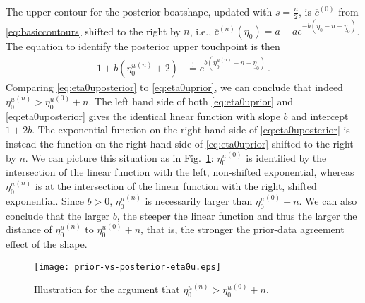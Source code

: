\documentclass[runningheads,a4paper]{llncs}
\newcommand{\uz}{^{(0)}} %
\newcommand{\un}{^{(n)}} %
\newcommand{\ul}[1]{\underline{#1}}
\newcommand{\ol}[1]{\overline{#1}}
\def\ezl{\ul{\eta}_0}
\def\czu{\ol{c}\uz}
\def\cnu{\ol{c}\un}
\begin{document}
The upper contour for the posterior boatshape,
updated with $s = \frac{n}{2}$, %
is $\czu$ from \eqref{eq:basiccontours} shifted to the right by $n$, i.e.,
$\cnu(\eta_0) = a - a e^{-b(\eta_0 - n -\ezl)}$.
The equation to identify the posterior upper touchpoint is then
\begin{align}
1 + b({\eta_0^u}\un + 2) &\stackrel{!}{=} e^{b({\eta_0^u}\un - n - \ezl)} \,.
\label{eq:eta0uposterior}
\end{align}
Comparing \eqref{eq:eta0uposterior} to \eqref{eq:eta0uprior}, we can conclude
that indeed ${\eta_0^u}\un > {\eta_0^u}\uz + n$.
%
The left hand side of both \eqref{eq:eta0uprior} and \eqref{eq:eta0uposterior}
gives the identical linear function with slope $b$ and intercept $1+2b$. %
The exponential function on the right hand side of \eqref{eq:eta0uposterior} is instead the function 
on the right hand side of \eqref{eq:eta0uprior} shifted to the right by $n$.
We can picture this situation as in Fig.~\ref{fig:spda1}:
${\eta_0^u}\uz$ is identified by the intersection of the linear function with the left,
non-shifted exponential, %
whereas ${\eta_0^u}\un$ is at the intersection of the linear function with the right,
shifted exponential. %
Since $b > 0$, ${\eta_0^u}\un$ is necessarily larger than ${\eta_0^u}\uz + n$.
%
We can also conclude that the larger $b$, the steeper the linear function
and thus the larger the distance of ${\eta_0^u}\un$ to ${\eta_0^u}\uz + n$,
that is, the stronger the prior-data agreement effect of the shape.
\begin{figure}  %
\centering
\texttt{[image: prior-vs-posterior-eta0u.eps]}%
\caption{Illustration for the argument that ${\eta_0^u}\un > {\eta_0^u}\uz + n$.}
\label{fig:spda1}
\end{figure}
\end{document}
